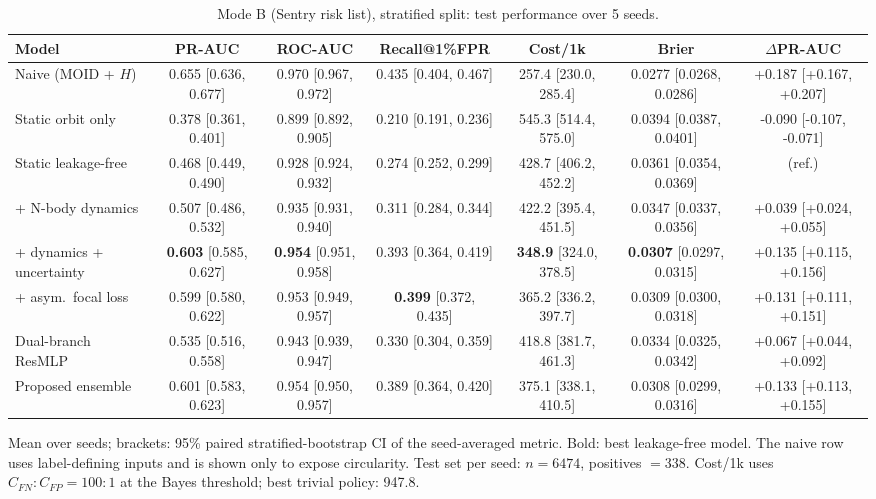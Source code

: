 \begin{table}[t]
\centering
\small
\caption{Mode B (Sentry risk list), stratified split: test performance over 5 seeds.}
\label{tab:sentry_stratified_all}
\begin{tabular}{lcccccc}
\toprule
Model & PR-AUC & ROC-AUC & Recall@1\%FPR & Cost/1k & Brier & $\Delta$PR-AUC \\
\midrule
Naive (MOID + $H$) & 0.655 \scriptsize{[0.636, 0.677]} & 0.970 \scriptsize{[0.967, 0.972]} & 0.435 \scriptsize{[0.404, 0.467]} & 257.4 \scriptsize{[230.0, 285.4]} & 0.0277 \scriptsize{[0.0268, 0.0286]} & +0.187 \scriptsize{[+0.167, +0.207]} \\
\midrule
Static orbit only & 0.378 \scriptsize{[0.361, 0.401]} & 0.899 \scriptsize{[0.892, 0.905]} & 0.210 \scriptsize{[0.191, 0.236]} & 545.3 \scriptsize{[514.4, 575.0]} & 0.0394 \scriptsize{[0.0387, 0.0401]} & -0.090 \scriptsize{[-0.107, -0.071]} \\
Static leakage-free & 0.468 \scriptsize{[0.449, 0.490]} & 0.928 \scriptsize{[0.924, 0.932]} & 0.274 \scriptsize{[0.252, 0.299]} & 428.7 \scriptsize{[406.2, 452.2]} & 0.0361 \scriptsize{[0.0354, 0.0369]} & (ref.) \\
+ N-body dynamics & 0.507 \scriptsize{[0.486, 0.532]} & 0.935 \scriptsize{[0.931, 0.940]} & 0.311 \scriptsize{[0.284, 0.344]} & 422.2 \scriptsize{[395.4, 451.5]} & 0.0347 \scriptsize{[0.0337, 0.0356]} & +0.039 \scriptsize{[+0.024, +0.055]} \\
+ dynamics + uncertainty & \textbf{0.603} \scriptsize{[0.585, 0.627]} & \textbf{0.954} \scriptsize{[0.951, 0.958]} & 0.393 \scriptsize{[0.364, 0.419]} & \textbf{348.9} \scriptsize{[324.0, 378.5]} & \textbf{0.0307} \scriptsize{[0.0297, 0.0315]} & +0.135 \scriptsize{[+0.115, +0.156]} \\
+ asym.\ focal loss & 0.599 \scriptsize{[0.580, 0.622]} & 0.953 \scriptsize{[0.949, 0.957]} & \textbf{0.399} \scriptsize{[0.372, 0.435]} & 365.2 \scriptsize{[336.2, 397.7]} & 0.0309 \scriptsize{[0.0300, 0.0318]} & +0.131 \scriptsize{[+0.111, +0.151]} \\
Dual-branch ResMLP & 0.535 \scriptsize{[0.516, 0.558]} & 0.943 \scriptsize{[0.939, 0.947]} & 0.330 \scriptsize{[0.304, 0.359]} & 418.8 \scriptsize{[381.7, 461.3]} & 0.0334 \scriptsize{[0.0325, 0.0342]} & +0.067 \scriptsize{[+0.044, +0.092]} \\
Proposed ensemble & 0.601 \scriptsize{[0.583, 0.623]} & 0.954 \scriptsize{[0.950, 0.957]} & 0.389 \scriptsize{[0.364, 0.420]} & 375.1 \scriptsize{[338.1, 410.5]} & 0.0308 \scriptsize{[0.0299, 0.0316]} & +0.133 \scriptsize{[+0.113, +0.155]} \\
\bottomrule
\end{tabular}
\par\vspace{2pt}\footnotesize Mean over seeds; brackets: 95\% paired stratified-bootstrap CI of the seed-averaged metric. Bold: best leakage-free model. The naive row uses label-defining inputs and is shown only to expose circularity. Test set per seed: $n=6474$, positives $=338$. Cost/1k uses $C_{FN}{:}C_{FP}=100{:}1$ at the Bayes threshold; best trivial policy: 947.8.
\end{table}
